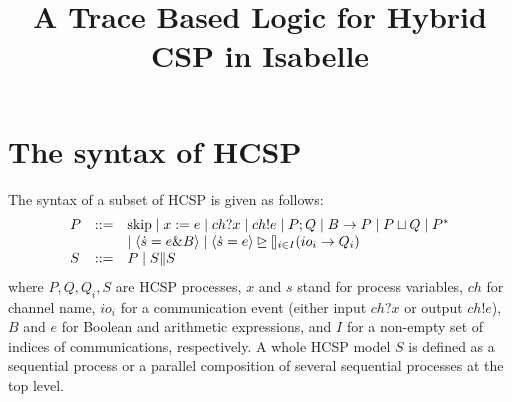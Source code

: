 \documentclass{llncs}
\begin{document}
\mainmatter

\title{A Trace Based Logic for Hybrid CSP in Isabelle}
\author{ }
\institute{ }


\maketitle

 \section{The syntax of HCSP}
 
 The syntax of a subset of HCSP is given as follows:
\[
\begin{array}{lll}
 P  & ::= & \textmd{skip} \mid x :=e  \mid ch?x \mid ch!e  \mid P;Q  \mid B \rightarrow P\mid  P \sqcup Q \mid P^*\\
      && \mid \langle \dot{s}=e\& B\rangle \mid \langle \dot{s}=e\rangle \unrhd \talloblong_{i\in I} (io_i \rightarrow Q_i)\\
 S &::=& P \mid S\|S
  \end{array}
 \]
where $P, Q, Q_i, S$ are HCSP processes, $x$ and $s$ stand for process variables,
 $ch$ for channel name, $io_i$ for a communication event (either input $ch?x$ or output  $ch!e$),
$B$ and $e$ for Boolean and arithmetic expressions,
 and $I$ for a non-empty set of indices of communications, respectively.
 A whole HCSP model $S$ is defined
 as a sequential process or a parallel composition of several sequential processes at the top level.
\end{document}
